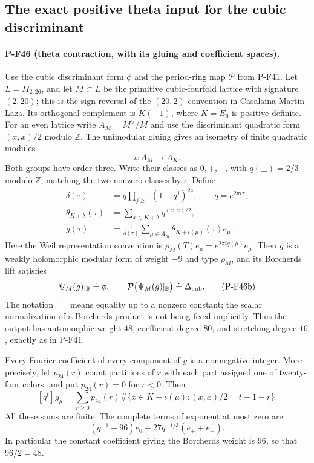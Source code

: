 \subsection{The exact positive theta input for the cubic discriminant}
\label{sec:theta-input}

\paragraph{P-F46 (theta contraction, with its gluing and coefficient spaces).}
Use the cubic discriminant form $\phi$ and the period-ring map
$\mathcal P$ from P-F41. Let $L=II_{2,26}$, and let
$M\subset L$ be the primitive cubic-fourfold lattice with
signature $(2,20)$; this is the sign reversal of the
$(20,2)$ convention in Casalaina-Martin--Laza. Its orthogonal
complement is $K(-1)$, where $K=E_6$ is positive definite.
For an even lattice write $A_M=M^\vee/M$ and use the
discriminant quadratic form $(x,x)/2$ modulo $\mathbb Z$.
The unimodular gluing gives an isometry of finite quadratic
modules
\[
                 \iota:A_M\longrightarrow A_K.
\]
Both groups have order three. Write their classes as
$0,+,-$, with $q(\pm)=2/3$ modulo $\mathbb Z$, matching
the two nonzero classes by $\iota$. Define
\[
 \begin{split}
 \delta(\tau)&=q\prod_{j\ge1}(1-q^j)^{24},
                  \qquad q=e^{2\pi i\tau},\\
 \theta_{K+\lambda}(\tau)
       &=\sum_{x\in K+\lambda}q^{(x,x)/2},\\
 g(\tau)&=\frac1{\delta(\tau)}
       \sum_{\mu\in A_M}\theta_{K+\iota(\mu)}(\tau)e_\mu.
 \end{split}
 \tag{P-F46a}
\]
Here the Weil representation convention is
$\rho_M(T)e_\mu=e^{2\pi i q(\mu)}e_\mu$.
Then $g$ is a weakly holomorphic modular form of weight
$-9$ and type $\rho_M$, and its Borcherds lift satisfies
\[
       \Psi_M(g)|_{\mathbb B}\doteq\phi,
       \qquad
       \mathcal P\bigl(\Psi_M(g)|_{\mathbb B}\bigr)
                   \doteq\Delta_{\rm cub}.
 \tag{P-F46b}
\]
The notation $\doteq$ means equality up to a nonzero
constant; the scalar normalization of a Borcherds product
is not being fixed implicitly. Thus the output has
automorphic weight $48$, coefficient degree $80$, and
stretching degree $16$, exactly as in P-F41.

Every Fourier coefficient of every component of $g$ is
a nonnegative integer. More precisely, let $p_{24}(r)$
count partitions of $r$ with each part assigned one of
twenty-four colors, and put $p_{24}(r)=0$ for $r<0$.
Then
\[
 [q^t]g_\mu
   =\sum_{r\ge0}p_{24}(r)
       \#\{x\in K+\iota(\mu):(x,x)/2=t+1-r\}.
 \tag{P-F46c}
\]
All these sums are finite. The complete terms of exponent
at most zero are
\[
        (q^{-1}+96)e_0
                   +27q^{-1/3}(e_++e_-).
 \tag{P-F46d}
\]
In particular the constant coefficient giving the
Borcherds weight is $96$, so that $96/2=48$.

